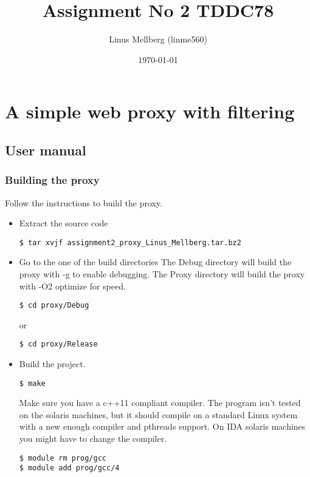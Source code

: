 \documentclass[a4paper,11pt]{article}
\begin{document}
\title{Assignment No 2 TDDC78}
\author{Linus Mellberg (linme560)}
\date{\today}
\maketitle
\pagebreak
\thispagestyle{tcr}
\pagestyle{tcr}

\section{A simple web proxy with filtering}
\subsection{User manual}
\subsubsection{Building the proxy}
Follow the instructions to build the proxy.
\begin{itemize}
  \item 
    Extract the source code
    \begin{verbatim}$ tar xvjf assignment2_proxy_Linus_Mellberg.tar.bz2
  \end{verbatim}
\item 
  Go to the one of the build directories
  The Debug directory will build the proxy with -g to enable debugging.
  The Proxy directory will build the proxy with -O2 optimize for speed.
  \begin{verbatim}$ cd proxy/Debug\end{verbatim}
  or
  \begin{verbatim}$ cd proxy/Release\end{verbatim}
\item
  Build the project.
  \begin{verbatim}$ make\end{verbatim}
  Make sure you have a c++11 compliant compiler.
  The program isn't tested on the solaris machines, but it should compile on a standard Linux system with a new enough compiler and pthreads support.
  On IDA solaris machines you might have to change the compiler.
  \begin{verbatim}$ module rm prog/gcc
$ module add prog/gcc/4\end{verbatim}
\end{itemize}
\end{document}
